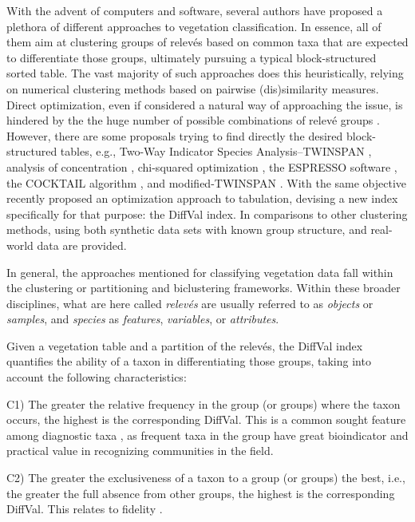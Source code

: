 With the advent of computers and software, several authors have proposed a plethora of different approaches to vegetation classification. In essence, all of them aim at clustering groups of relevés based on common taxa that are expected to differentiate those groups, ultimately pursuing a typical block-structured sorted table. The vast majority of such approaches does this heuristically, relying on numerical clustering methods based on pairwise (dis)similarity measures. Direct optimization, even if considered a natural way of approaching the issue, is hindered by the the huge number of possible combinations of relevé groups \citep{PR13}. However, there are some proposals trying to find directly the desired block-structured tables, e.g., Two-Way Indicator Species Analysis--TWINSPAN \citep{HMO1979}, analysis of concentration \citep{FO1979}, chi-squared optimization \citep{PF1991}, the ESPRESSO software \citep{BF1994}, the COCKTAIL algorithm \citep{BHelge2000}, and modified-TWINSPAN \citep{RTZC2009}. With the same objective \citet{MH2025} recently proposed an optimization approach to tabulation, devising a new index specifically for that purpose: the DiffVal index. In \citet{MH2025} comparisons to other clustering methods, using both synthetic data sets with known group structure, and real-world data are provided.

In general, the approaches mentioned for classifying vegetation data fall within the clustering or partitioning \citep{KR1990} and biclustering \citep{CAM2024} frameworks. Within these broader disciplines, what are here called \emph{relevés} are usually referred to as \emph{objects} or \emph{samples}, and \emph{species} as \emph{features}, \emph{variables}, or \emph{attributes}.

Given a vegetation table and a partition of the relevés, the DiffVal index quantifies the ability of a taxon in differentiating those groups, taking into account the following characteristics:

C1) The greater the relative frequency in the group (or groups) where the taxon occurs, the highest is the corresponding DiffVal. This is a common sought feature among diagnostic taxa \citep[see, e.g., the IndVal index of][]{DL1997}, as frequent taxa in the group have great bioindicator and practical value in recognizing communities in the field.

C2) The greater the exclusiveness of a taxon to a group (or groups) the best, i.e., the greater the full absence from other groups, the highest is the corresponding DiffVal. This relates to fidelity \citep[sensu][]{ME1974}.

